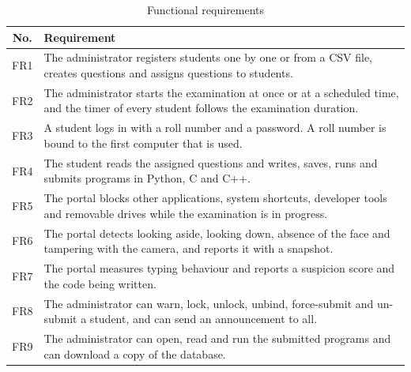 \documentclass[12pt,a4paper]{report}
\begin{document}
\begin{table}[H]
\centering
\caption{Functional requirements}\label{tab:fr}
\footnotesize
\begin{tabularx}{\textwidth}{@{}c Y@{}}
\toprule
\textbf{No.} & \textbf{Requirement}\\
\midrule
FR1 & The administrator registers students one by one or from a CSV file, creates questions and assigns questions to students.\\
FR2 & The administrator starts the examination at once or at a scheduled time, and the timer of every student follows the examination duration.\\
FR3 & A student logs in with a roll number and a password. A roll number is bound to the first computer that is used.\\
FR4 & The student reads the assigned questions and writes, saves, runs and submits programs in Python, C and C++.\\
FR5 & The portal blocks other applications, system shortcuts, developer tools and removable drives while the examination is in progress.\\
FR6 & The portal detects looking aside, looking down, absence of the face and tampering with the camera, and reports it with a snapshot.\\
FR7 & The portal measures typing behaviour and reports a suspicion score and the code being written.\\
FR8 & The administrator can warn, lock, unlock, unbind, force-submit and un-submit a student, and can send an announcement to all.\\
FR9 & The administrator can open, read and run the submitted programs and can download a copy of the database.\\
\bottomrule
\end{tabularx}
\end{table}
\end{document}
